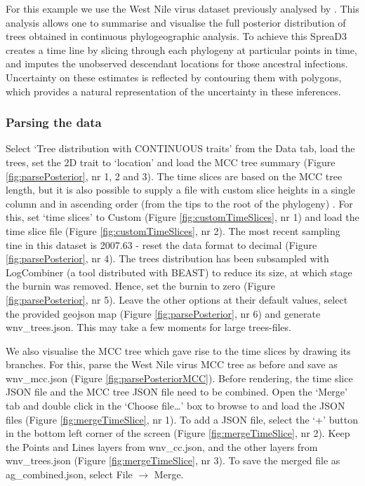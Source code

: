 \documentclass[english]{paper}
\def \spreadname {SpreaD3}
\begin{document}
For this example we use the West Nile virus dataset previously analysed by \citet{Pybus:2012aa}.
This analysis allows one to summarise and visualise the full posterior distribution of trees obtained in continuous phylogeographic analysis. 
To achieve this {\spreadname} creates a time line by slicing through each phylogeny at particular points in time, and imputes the unobserved descendant locations for those ancestral infections.
Uncertainty on these estimates is reflected by contouring them with polygons, which provides a natural representation of the uncertainty in these inferences. 

\subsubsection{Parsing the data}

Select `Tree distribution with CONTINUOUS traits' from the Data tab, load the trees, set the 2D trait to `location' and load the MCC tree summary 
(Figure \ref{fig:parsePosterior}, nr 1, 2 and 3).
The time slices are based on the MCC tree length, but it is also possible to supply a file with custom slice heights in a single column and in ascending order (from the tips to the root of the phylogeny) . 
For this, set `time slices' to Custom (Figure \ref{fig:customTimeSlices}, nr 1) and load the time slice file (Figure \ref{fig:customTimeSlices}, nr 2).
The most recent sampling tine in this dataset is 2007.63 - reset the data format to decimal 
(Figure \ref{fig:parsePosterior}, nr 4).
The trees distribution has been subsampled with LogCombiner (a tool distributed with BEAST) to reduce its size, at which stage the burnin was removed. 
Hence, set the burnin to zero 
(Figure \ref{fig:parsePosterior}, nr 5).
Leave the other options at their default values, select the provided geojson map (Figure \ref{fig:parsePosterior}, nr 6) and generate wnv\_trees.json.
This may take a few moments for large trees-files.
\par
We also visualise the MCC tree which gave rise to the time slices by drawing its branches.
For this, parse the West Nile virus MCC tree as before and save as wnv\_mcc.json (Figure \ref{fig:parsePosteriorMCC}).
Before rendering, the time slice JSON file and the MCC tree JSON file need to be combined.
Open the `Merge' tab and double click in the `Choose file\dots' box to browse to and load the JSON files (Figure \ref{fig:mergeTimeSlice}, nr 1).
To add a JSON file, select the `+' button in the bottom left corner of the screen (Figure \ref{fig:mergeTimeSlice}, nr 2).
Keep the Points and Lines layers from wnv\_cc.json, and the other layers from wnv\_trees.json (Figure \ref{fig:mergeTimeSlice}, nr 3).
To save the merged file as ag\_combined.json, select File $\rightarrow$  Merge. 
\end{document}
